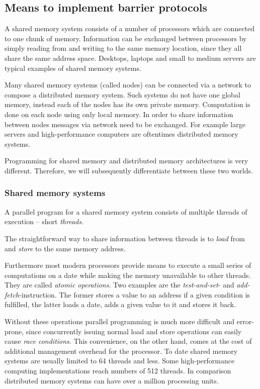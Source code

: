 \documentclass[a4paper, 10pt]{article}
\begin{document}
\subsection{Means to implement barrier protocols}
\label{ssec:background-means}
A shared memory system consists of a number of processors which are connected to one chunk of memory. Information can be exchanged between processors by simply reading from and writing to the same memory location, since they all share the same address space.
Desktops, laptops and small to medium servers are typical examples of shared memory systems.

Many shared memory systems (called nodes) can be connected via a network to compose a distributed memory system. Such systems do not have one global memory, instead each of the nodes has its own private memory. Computation is done on each node using only local memory. In order to share information between nodes messages via network need to be exchanged.
For example large servers and high-performance computers are oftentimes distributed memory systems.

Programming for shared memory and distributed memory architectures is very different. Therefore, we will subsequently differentiate between these two worlds.

\subsubsection{Shared memory systems}
\label{sssec:background-means-shared}
A parallel program for a shared memory system consists of multiple threads of execution -- short \emph{threads}.

The straightforward way to share information between threads is to \emph{load} from and \emph{store} to the same memory address.

Furthermore most modern processors provide means to execute a small series of computations on a date while making the memory unavailable to other threads. They are called \emph{atomic operations}. Two examples are the \emph{test-and-set}- and \emph{add-fetch}-instruction. The former stores a value to an address if a given condition is fulfilled, the latter loads a date, adds a given value to it and stores it back.

Without these operations parallel programming is much more difficult and error-prone, since concurrently issuing normal load and store operations can easily cause \emph{race conditions}. This convenience, on the other hand, comes at the cost of additional management overhead for the processor. To date shared memory systems are usually limited to 64 threads and less. Some high-performance computing implementations reach numbers of 512 threads. In comparison distributed memory systems can have over a million processing units.
\end{document}

